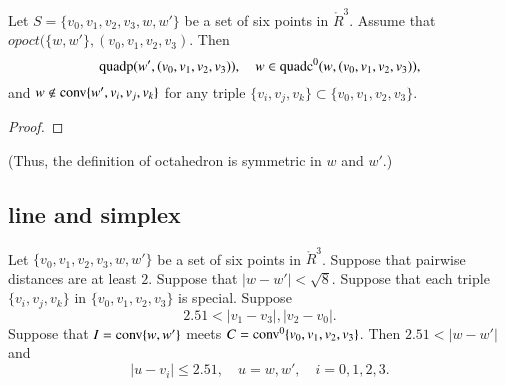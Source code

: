 \newpage

\begin{lemma}
Let $S=\{v_0,v_1,v_2,v_3,w,w'\}$ be a set of six points
in $\ring{R}^3$.  Assume that $op{oct}(\{w,w'\},(v_0,v_1,v_2,v_3)$.
Then 
$$
  {\operatorname{quadp}}(w',(v_0,v_1,v_2,v_3)),\quad
   w\in{\operatorname{quadc}}^0(w,(v_0,v_1,v_2,v_3)),
$$
and $w\not\in{\operatorname{conv}}\{w',v_i,v_j,v_k\}$ for any triple
$\{v_i,v_j,v_k\}\subset \{v_0,v_1,v_2,v_3\}$.
\end{lemma}

\begin{proof}
\end{proof}


(Thus, the definition of octahedron is symmetric in $w$ and $w'$.)%




\newpage

\subsection{line and simplex}





\begin{lemma}
Let $\{v_0,v_1,v_2,v_3,w,w'\}$ be a set of six points in $\ring{R}^3$.
Suppose that pairwise distances are at least $2$.  Suppose that
$|w-w'| < \sqrt8$.  Suppose that each triple $\{v_i,v_j,v_k\}$
in $\{v_0,v_1,v_2,v_3\}$ is special. 
Suppose   
   $$
   2.51 < |v_1-v_3|,|v_2-v_0|.
   $$
Suppose that $I={\operatorname{conv}}\{w,w'\}$  meets $C={\operatorname{conv}}^0\{v_0,v_1,v_2,v_3\}$.
Then $2.51 < |w-w'|$ and
  $$
  |u-v_i|\le 2.51,\quad u=w,w',\quad i=0,1,2,3.
  $$
\end{lemma}
%


